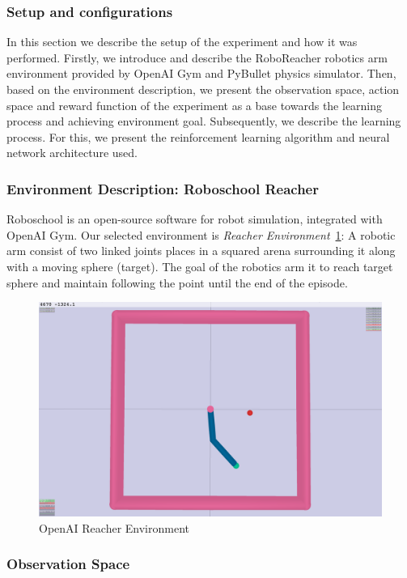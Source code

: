 \subsubsection{Setup and configurations}

In this section we describe the setup of the experiment and how it was performed. Firstly, we introduce and describe the RoboReacher robotics arm environment provided by OpenAI Gym and PyBullet physics simulator. Then, based on the environment description, we present the observation space, action space and reward function of the experiment as a base towards the learning process and achieving environment goal. Subsequently, we describe the learning process. For this, we present the reinforcement learning algorithm and neural network architecture used.


\subsubsection{Environment Description: Roboschool Reacher}
Roboschool is an open-source software for robot simulation, integrated with OpenAI Gym. Our selected environment is \textit{Reacher Environment}~\ref{fig:openai_reacher}: A robotic arm consist of two linked joints places in a squared arena surrounding it along with a moving sphere (target). The goal of the robotics arm it to reach target sphere and maintain following the point until the end of the episode. 

\begin{figure}[!htb]
		\centering
				\includegraphics[width=0.7\linewidth]{figures/envs/openai_roboreacher.png}
				\caption{OpenAI Reacher Environment}
				\label{fig:openai_reacher}
\end{figure}

\subsubsection{Observation Space}

